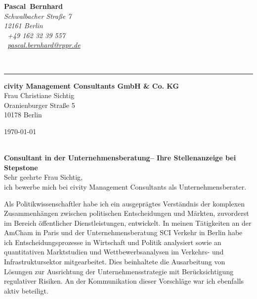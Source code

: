 \documentclass[11pt,a4paper]{article}
\def\firstname{Pascal}
\def\familyname{Bernhard}
\begin{document}
\sffamily   %
\hfill%
\begin{minipage}[t]{.6\textwidth}
	\raggedleft%
	{\bfseries {\color{firstnamecolor}\firstname}~{\color{familynamecolor}\familyname}}\\[.35ex]
	\small\itshape%
	Schwalbacher Straße 7\\
	12161 Berlin\\[.35ex]
	\Mobilefone~+49 162 32 39 557 \\
	\Letter~\href{mailto:pascal.bernhard@rppr.de}{pascal.bernhard@rppr.de}
\end{minipage}\\[0.5em]
%
{\color{firstnamecolor}\rule{\textwidth}{.25ex}}
%
\begin{minipage}[t]{.4\textwidth}
	\raggedright%
	\vspace*{1em}
	\textbf{civity Management Consultants GmbH \& Co. KG} \\
	Frau Christiane Sichtig \\[.35ex]
	\small%
	Oranienburger Straße 5\\
	10178 Berlin
\end{minipage}
%
\hfill
%
\begin{minipage}[t]{.4\textwidth}
	\raggedleft %
	\today
\end{minipage}\\[1em]


{\bfseries \color{familynamecolor}Consultant in der Unternehmensberatung-- Ihre Stellenanzeige bei Stepstone}\\[0.75em]

Sehr geehrte Frau Sichtig,\\[0.5em]
%
ich bewerbe mich bei civity Management Consultants als Unternehmensberater.

Als Politikwissenschaftler habe ich ein ausgeprägtes Verständnis der komplexen Zusammenhängen zwischen politischen Entscheidungen und Märkten, zuvorderst im Bereich öffentlicher Dienstleistungen, entwickelt. In meinen Tätigkeiten an der AmCham in Paris und der Unternehmensberatung SCI Verkehr in Berlin habe ich Entscheidungsprozesse in Wirtschaft und Politik analysiert sowie an quantitativen Marktstudien und Wettbewerbsanalysen im Verkehrs- und Infrastruktursektor mitgearbeitet. Dies beinhaltete die Ausarbeitung von Lösungen zur Ausrichtung der Unternehmensstrategie mit Berücksichtigung regulativer Risiken. An der Kommunikation dieser Vorschläge war ich ebenfalls aktiv beteiligt.
\end{document}
